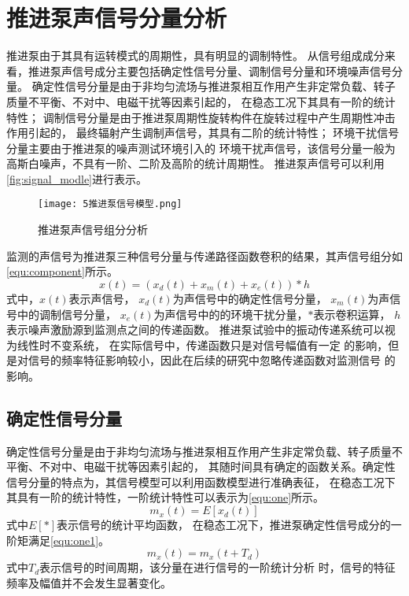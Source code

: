 \section{推进泵声信号分量分析}
推进泵由于其具有运转模式的周期性，具有明显的调制特性。
从信号组成成分来看，推进泵声信号成分主要包括确定性信号分量、调制信号分量和环境噪声信号分量。
确定性信号分量是由于非均匀流场与推进泵相互作用产生非定常负载、转子质量不平衡、不对中、电磁干扰等因素引起的，
在稳态工况下其具有一阶的统计特性；
调制信号分量是由于推进泵周期性旋转构件在旋转过程中产生周期性冲击作用引起的，
最终辐射产生调制声信号，其具有二阶的统计特性；
环境干扰信号分量主要由于推进泵的噪声测试环境引入的
环境干扰声信号，该信号分量一般为高斯白噪声，不具有一阶、二阶及高阶的统计周期性\cite{antoniCyclostationaryModellingRotating2004a,song2019}。
推进泵声信号可以利用\autoref{fig:signal_modle}进行表示。
\begin{figure}[htbp]
    \centering
    \texttt{[image: 5推进泵信号模型.png]}
    \caption{\label{fig:signal_modle}推进泵声信号组分分析}
\end{figure}

监测的声信号为推进泵三种信号分量与传递路径函数卷积的结果，其声信号组分如\autoref{equ:component}所示。 
\begin{equation}
    \label{equ:component}
    x\left ( t \right ) =\left ( x_d\left ( t \right )+x_m\left ( t \right )+x_e\left ( t \right ) \right )\ast h 
\end{equation}
式中，$x\left ( t \right )$表示声信号，
$x_d\left ( t \right )$为声信号中的确定性信号分量，
$x_m\left ( t \right )$为声信号中的调制信号分量，
$x_e\left ( t \right )$为声信号中的的环境干扰分量，$\ast$表示卷积运算，
$h$表示噪声激励源到监测点之间的传递函数。 
推进泵试验中的振动传递系统可以视为线性时不变系统，
在实际信号中，传递函数只是对信号幅值有一定
的影响，但是对信号的频率特征影响较小，因此在后续的研究中忽略传递函数对监测信号
的影响\cite{song2019}。 

\subsection{确定性信号分量}
确定性信号分量是由于非均匀流场与推进泵相互作用产生非定常负载、转子质量不平衡、不对中、电磁干扰等因素引起的，
其随时间具有确定的函数关系。确定性信号分量的特点为，其信号模型可以利用函数模型进行准确表征，
在稳态工况下其具有一阶的统计特性，一阶统计特性可以表示为\autoref{equ:one}所示。
\begin{equation}
    \label{equ:one}
    m_{x}\left ( t \right ) =E\left [ x_{d}\left ( t   \right )  \right ]
\end{equation}
式中$E[*]$表示信号的统计平均函数，
在稳态工况下，推进泵确定性信号成分的一阶矩满足\autoref{equ:one1}。
\begin{equation}
    \label{equ:one1}
    m_{x}\left ( t \right ) =m_{x}\left ( t+T_d \right )
\end{equation}
式中$T_{d}$表示信号的时间周期，该分量在进行信号的一阶统计分析
时，信号的特征频率及幅值并不会发生显著变化。
